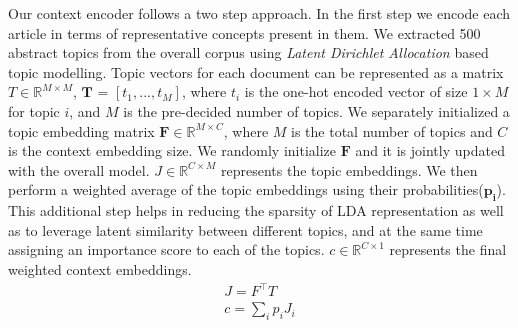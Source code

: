 Our context encoder follows a two step approach. In the first step we encode each article in terms of representative concepts present in them. We extracted 500 abstract topics from the overall corpus using \emph{Latent Dirichlet Allocation} based topic modelling. Topic vectors for each document can be represented as a matrix  $T \in \mathbb{R}^{M\times M}$, $\boldsymbol{T}$ = $[t_1,...,t_M]$, where $t_i$ is the one-hot encoded vector of size $1 \times M$ for topic $i$, and $M$ is the pre-decided number of topics. We separately initialized a topic embedding matrix $\boldsymbol{F} \in \mathbb{R}^{M\times C}$, where $M$ is the total number of topics and  $C$ is the context embedding size. We randomly initialize $\boldsymbol{F}$ and it is jointly updated with the overall model. $J \in \mathbb{R}^{C\times M}$ represents the topic embeddings. We then perform a weighted average of the topic embeddings using their probabilities($\boldsymbol{p_i}$). This additional step helps in reducing the sparsity of LDA representation as well as to leverage latent similarity between different topics, and at the same time assigning an importance score to each of the topics. $c \in \mathbb{R}^{C\times 1}$ represents the final weighted context embeddings.
\vspace{-1mm}
\begin{eqnarray}
J =  F^\intercal T \\
c = \sum\limits_{i} p_i J_i
\label{eq3}
\end{eqnarray}
\vspace{-3mm}
